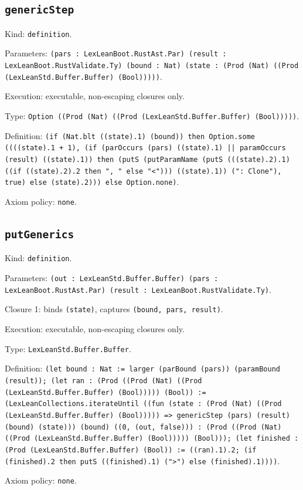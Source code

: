 \documentclass[11pt]{article}
\begin{document}
\subsection*{\texttt{genericStep}}
\noindent Kind: \texttt{definition}.\par
\noindent Parameters: \texttt{(pars : LexLeanBoot.RustAst.Par) (result : LexLeanBoot.RustValidate.Ty) (bound : Nat) (state : (Prod (Nat) ((Prod (LexLeanStd.Buffer.Buffer) (Bool)))))}.\par
\noindent Execution: executable, non-escaping closures only.\par
\noindent Type: \texttt{Option ((Prod (Nat) ((Prod (LexLeanStd.Buffer.Buffer) (Bool)))))}.\par
\noindent Definition: \texttt{(if (Nat.blt ((state).1) (bound)) then Option.some ((((state).1 + 1), (if (parOccurs (pars) ((state).1) || paramOccurs (result) ((state).1)) then (putS (putParamName (putS (((state).2).1) ((if ((state).2).2 then ", " else "<"))) ((state).1)) (": Clone"), true) else (state).2))) else Option.none)}.\par
\noindent Axiom policy: \texttt{none}.\par
\subsection*{\texttt{putGenerics}}
\noindent Kind: \texttt{definition}.\par
\noindent Parameters: \texttt{(out : LexLeanStd.Buffer.Buffer) (pars : LexLeanBoot.RustAst.Par) (result : LexLeanBoot.RustValidate.Ty)}.\par
\noindent Closure 1: binds \texttt{(state)}, captures \texttt{(bound, pars, result)}.\par
\noindent Execution: executable, non-escaping closures only.\par
\noindent Type: \texttt{LexLeanStd.Buffer.Buffer}.\par
\noindent Definition: \texttt{(let bound : Nat := larger (parBound (pars)) (paramBound (result)); (let ran : (Prod ((Prod (Nat) ((Prod (LexLeanStd.Buffer.Buffer) (Bool))))) (Bool)) := (LexLeanCollections.iterateUntil ((fun (state : (Prod (Nat) ((Prod (LexLeanStd.Buffer.Buffer) (Bool))))) => genericStep (pars) (result) (bound) (state))) (bound) ((0, (out, false))) : (Prod ((Prod (Nat) ((Prod (LexLeanStd.Buffer.Buffer) (Bool))))) (Bool))); (let finished : (Prod (LexLeanStd.Buffer.Buffer) (Bool)) := ((ran).1).2; (if (finished).2 then putS ((finished).1) (">") else (finished).1))))}.\par
\noindent Axiom policy: \texttt{none}.\par
\end{document}
